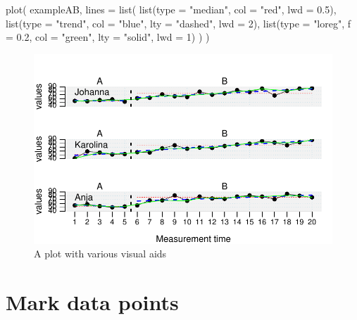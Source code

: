 \documentclass[
  letterpaper,
  DIV=11,
  numbers=noendperiod]{scrreprt}
\newenvironment{Shaded}{\begin{snugshade}}{\end{snugshade}}
\newcommand{\AttributeTok}[1]{\textcolor[rgb]{0.40,0.45,0.13}{#1}}
\newcommand{\DecValTok}[1]{\textcolor[rgb]{0.68,0.00,0.00}{#1}}
\newcommand{\FloatTok}[1]{\textcolor[rgb]{0.68,0.00,0.00}{#1}}
\newcommand{\FunctionTok}[1]{\textcolor[rgb]{0.28,0.35,0.67}{#1}}
\newcommand{\NormalTok}[1]{\textcolor[rgb]{0.00,0.23,0.31}{#1}}
\newcommand{\StringTok}[1]{\textcolor[rgb]{0.13,0.47,0.30}{#1}}
\begin{document}
\begin{Shaded}
\begin{Highlighting}[]
\FunctionTok{plot}\NormalTok{(}
\NormalTok{  exampleAB, }
  \AttributeTok{lines =} \FunctionTok{list}\NormalTok{(}
    \FunctionTok{list}\NormalTok{(}\AttributeTok{type =} \StringTok{"median"}\NormalTok{, }\AttributeTok{col =} \StringTok{"red"}\NormalTok{, }\AttributeTok{lwd =} \FloatTok{0.5}\NormalTok{),}
    \FunctionTok{list}\NormalTok{(}\AttributeTok{type =} \StringTok{"trend"}\NormalTok{, }\AttributeTok{col =} \StringTok{"blue"}\NormalTok{, }\AttributeTok{lty =} \StringTok{"dashed"}\NormalTok{, }\AttributeTok{lwd =} \DecValTok{2}\NormalTok{),}
    \FunctionTok{list}\NormalTok{(}\AttributeTok{type =} \StringTok{"loreg"}\NormalTok{, }\AttributeTok{f =} \FloatTok{0.2}\NormalTok{, }\AttributeTok{col =} \StringTok{"green"}\NormalTok{, }\AttributeTok{lty =} \StringTok{"solid"}\NormalTok{, }\AttributeTok{lwd =} \DecValTok{1}\NormalTok{)}
\NormalTok{  )}
\NormalTok{)}
\end{Highlighting}
\end{Shaded}

\begin{figure}[H]

{\centering \includegraphics{./ch_creating_a_plot_files/figure-pdf/ex-plot-lines-1.pdf}

}

\caption{A plot with various visual aids}

\end{figure}

\hypertarget{mark-data-points}{%
\section{Mark data points}\label{mark-data-points}}
\end{document}
